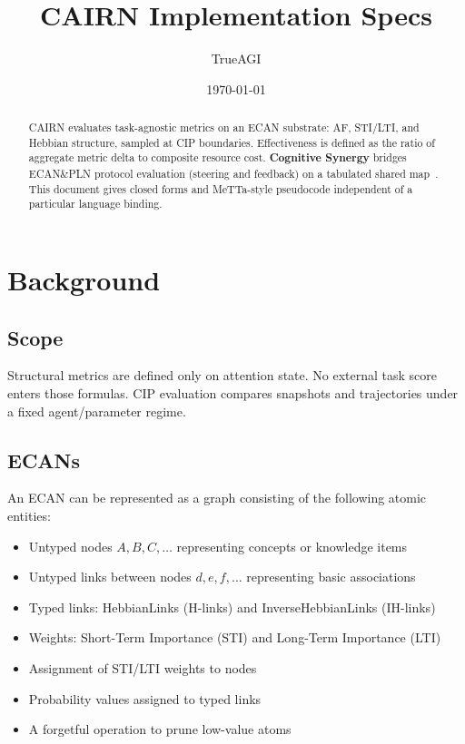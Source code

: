 \documentclass[11pt]{article}
\title{CAIRN Implementation Specs}
\author{TrueAGI}
\date{\today}
\theoremstyle{definition}
\begin{document}
\maketitle

\begin{abstract}
CAIRN evaluates task-agnostic metrics on an ECAN substrate: AF, STI/LTI, and Hebbian structure, sampled at CIP boundaries. Effectiveness is defined as the ratio of aggregate metric delta to composite resource cost. \textbf{Cognitive Synergy} bridges ECAN\&PLN protocol evaluation (steering and feedback) on a tabulated shared map~\cite{nldapli,ECAN,tauSLD,allegories}. This document gives closed forms and MeTTa-style pseudocode independent of a particular language binding.
\end{abstract}

\tableofcontents
\newpage

\section{Background}\label{sec:background}

\subsection{Scope}

Structural metrics are defined only on attention state. No external task score enters those formulas. CIP evaluation compares snapshots and trajectories under a fixed agent/parameter regime.

\subsection{ECANs}

An ECAN can be represented as a graph consisting of the following atomic entities:

\begin{itemize}
    \item Untyped nodes $A, B, C, \ldots$ representing concepts or knowledge items
    \item Untyped links between nodes $d, e, f, \ldots$ representing basic associations
    \item Typed links: HebbianLinks (H-links) and InverseHebbianLinks (IH-links)
    \item Weights: Short-Term Importance (STI) and Long-Term Importance (LTI)
    \item Assignment of STI/LTI weights to nodes
    \item Probability values assigned to typed links
    \item A forgetful operation to prune low-value atoms
\end{itemize}
\end{document}
